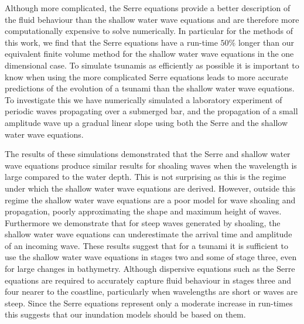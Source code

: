 Although more complicated, the Serre equations provide a better description of the fluid behaviour than the shallow water wave equations and are therefore more computationally expensive to solve numerically. In particular for the methods of this work, we find that the Serre equations have a run-time $50\%$ longer than our equivalent finite volume method for the shallow water wave equations in the one dimensional case. To simulate tsunamis as efficiently as possible it is important to know when using the more complicated Serre equations leads to more accurate predictions of the evolution of a tsunami than the shallow water wave equations. To investigate this we have numerically simulated a laboratory experiment of periodic waves propagating over a submerged bar, and the propagation of a small amplitude wave up a gradual linear slope using both the Serre and the shallow water wave equations.

The results of these simulations demonstrated that the Serre and shallow water wave equations produce similar results for shoaling waves when the wavelength is large compared to the water depth. This is not surprising as this is the regime under which the shallow water wave equations are derived. However, outside this regime the shallow water wave equations are a poor model for wave shoaling and propagation, poorly approximating the shape and maximum height of waves. Furthermore we demonstrate that for steep waves generated by shoaling, the shallow water wave equations can underestimate the arrival time and amplitude of an incoming wave. These results suggest that for a tsunami it is sufficient to use the shallow water wave equations in stages two and some of stage three, even for large changes in bathymetry. Although dispersive equations such as the Serre equations are required to accurately capture fluid behaviour in stages three and four nearer to the coastline, particularly when wavelengths are short or waves are steep. Since the Serre equations represent only a moderate increase in run-times this suggests that our inundation models should be based on them.
\newpage

